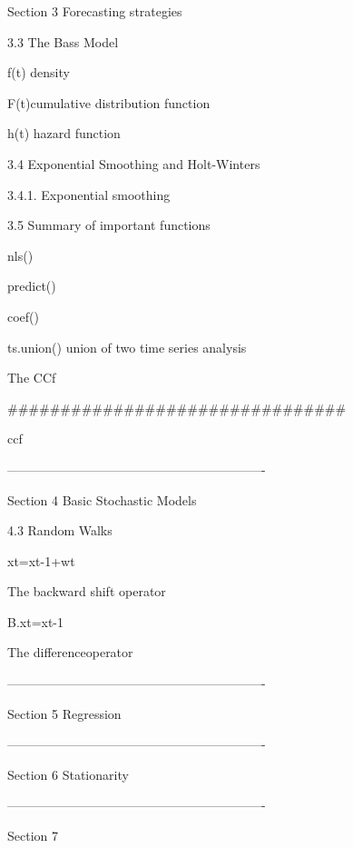 Section 3 Forecasting strategies


3.3 The Bass Model






 f(t) density

 F(t)cumulative distribution function

 h(t) hazard function


3.4 Exponential Smoothing and Holt-Winters

3.4.1. Exponential smoothing


3.5 Summary of important functions

 nls()

 predict()

 coef()

 ts.union() union of two time series analysis


The CCf


################################

ccf

-------------------------------------------------------------

Section 4 Basic Stochastic Models

4.3 Random Walks



xt=xt-1+wt


The backward shift operator


B.xt=xt-1


The differenceoperator

-------------------------------------------------------------

Section 5 Regression


-------------------------------------------------------------

Section 6 Stationarity


-------------------------------------------------------------

Section 7


